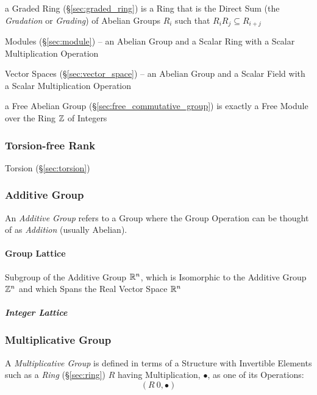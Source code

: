 \fist a Graded Ring (\S\ref{sec:graded_ring}) is a Ring that is the Direct Sum
(the \emph{Gradation} or \emph{Grading}) of Abelian Groups $R_i$ such that
$R_iR_j \subseteq R_{i+j}$

\fist Modules (\S\ref{sec:module}) -- an Abelian Group and a Scalar Ring with a
Scalar Multiplication Operation

\fist Vector Spaces (\S\ref{sec:vector_space}) -- an Abelian Group and a Scalar
Field with a Scalar Multiplication Operation

\fist a Free Abelian Group (\S\ref{sec:free_commutative_group}) is exactly a
Free Module over the Ring $\mathbb{Z}$ of Integers



\subsubsection{Torsion-free Rank}\label{sec:torsionfree_rank}

Torsion (\S\ref{sec:torsion})



\subsubsection{Additive Group}\label{sec:additive_group}

An \emph{Additive Group} refers to a Group where the Group Operation
can be thought of as \emph{Addition} (usually Abelian).



\paragraph{Group Lattice}\label{sec:group_lattice}\hfill

Subgroup of the Additive Group $\mathbb{R}^n$, which is Isomorphic to the Additive
Group $\mathbb{Z}^n$ and which Spans the Real Vector Space $\mathbb{R}^n$



\subparagraph{Integer Lattice}\label{sec:integer_lattice}\hfill



\subsubsection{Multiplicative Group}\label{sec:multiplicative_group}

A \emph{Multiplicative Group} is defined in terms of a Structure with
Invertible Elements such as a \emph{Ring} (\S\ref{sec:ring}) $R$
having Multiplication, $\bullet$, as one of its Operations:
\[
  (R \ {0}, \bullet)
\]

